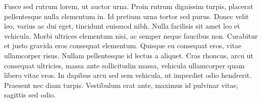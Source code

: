 \documentclass[twoside]{article}
\begin{document}
\autoversenumber Fusce sed rutrum lorem, ut auctor urna.
\autoversenumber Proin rutrum dignissim turpis, placerat pellentesque nulla elementum in.
\autoversenumber Id pretium urna tortor sed purus.
\autoversenumber Donec velit leo, varius ac dui eget, tincidunt euismod nibh.
\autoversenumber Nulla facilisis sit amet leo et vehicula.
\autoversenumber Morbi ultrices elementum nisi, ac semper neque faucibus non.
\autoversenumber Curabitur et justo gravida eros consequat elementum.
\autoversenumber Quisque eu consequat eros, vitae ullamcorper risus.
\autoversenumber Nullam pellentesque id lectus a aliquet.
\autoversenumber Cras rhoncus, arcu ut consequat ultricies, massa ante sollicitudin massa, vehicula ullamcorper quam libero vitae eros.
\autoversenumber In dapibus arcu sed sem vehicula, ut imperdiet odio hendrerit.
\autoversenumber Praesent nec diam turpis.
\autoversenumber Vestibulum erat ante, maximus id pulvinar vitae, sagittis sed odio.

\pend
\endnumbering
\end{document}
